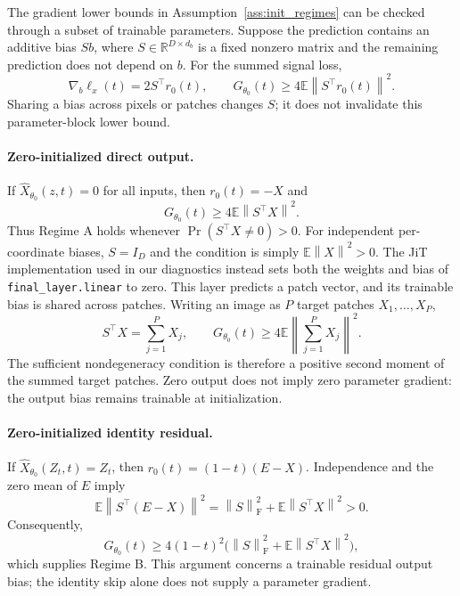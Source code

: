 \documentclass{article}
\theoremstyle{plain}
\theoremstyle{definition}
\theoremstyle{remark}
\newcommand{\Ex}{\mathbb{E}}
\newcommand{\norm}[1]{\left\lVert #1\right\rVert}
\begin{document}
The gradient lower bounds in Assumption~\ref{ass:init_regimes} can be checked through a subset of trainable parameters. Suppose the prediction contains an additive bias $Sb$, where $S\in\mathbb R^{D\times d_b}$ is a fixed nonzero matrix and the remaining prediction does not depend on $b$. For the summed signal loss,
\begin{equation}
\nabla_b\ell_x(t)=2S^\top r_0(t),\qquad
G_{\theta_0}(t)\ge4\Ex\norm{S^\top r_0(t)}^2.
\end{equation}
Sharing a bias across pixels or patches changes $S$; it does not invalidate this parameter-block lower bound.

\paragraph{Zero-initialized direct output.}
If $\hat X_{\theta_0}(z,t)=0$ for all inputs, then $r_0(t)=-X$ and
\begin{equation}
G_{\theta_0}(t)\ge4\Ex\norm{S^\top X}^2.
\label{eq:zero_head_bias}
\end{equation}
Thus Regime A holds whenever $\Pr(S^\top X\ne0)>0$. For independent per-coordinate biases, $S=I_D$ and the condition is simply $\Ex\norm{X}^2>0$. The JiT implementation used in our diagnostics instead sets both the weights and bias of \texttt{final\_layer.linear} to zero. This layer predicts a patch vector, and its trainable bias is shared across patches. Writing an image as $P$ target patches $X_1,\ldots,X_P$,
\begin{equation}
S^\top X=\sum_{j=1}^P X_j,\qquad
G_{\theta_0}(t)\ge4\Ex\norm{\sum_{j=1}^P X_j}^2.
\label{eq:jit_patch_bias}
\end{equation}
The sufficient nondegeneracy condition is therefore a positive second moment of the summed target patches. Zero output does not imply zero parameter gradient: the output bias remains trainable at initialization.

\paragraph{Zero-initialized identity residual.}
If $\hat X_{\theta_0}(Z_t,t)=Z_t$, then $r_0(t)=(1-t)(E-X)$. Independence and the zero mean of $E$ imply
\begin{equation}
\Ex\norm{S^\top(E-X)}^2
=\norm{S}_{\mathrm F}^2+\Ex\norm{S^\top X}^2>0.
\end{equation}
Consequently,
\begin{equation}
G_{\theta_0}(t)\ge
4(1-t)^2\big(\norm{S}_{\mathrm F}^2+\Ex\norm{S^\top X}^2\big),
\end{equation}
which supplies Regime B. This argument concerns a trainable residual output bias; the identity skip alone does not supply a parameter gradient.
\end{document}
